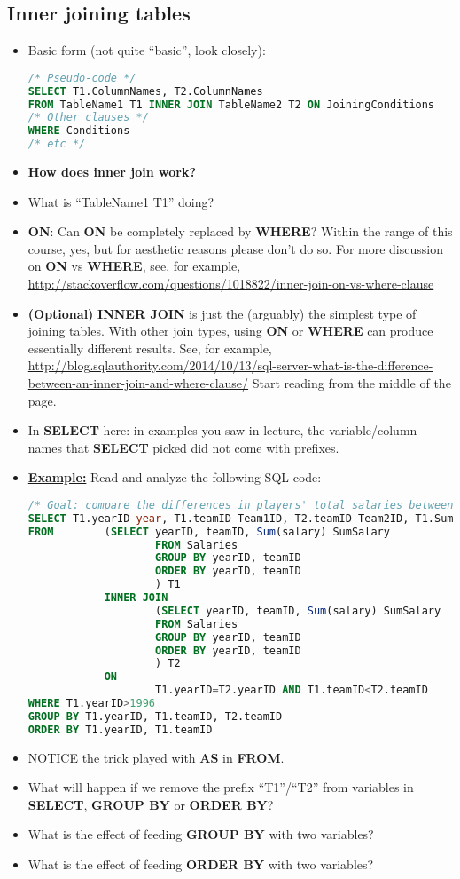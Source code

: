\documentclass[12pt]{article}
\begin{document}
\subsection{Inner joining tables}
\begin{itemize}
	\item Basic form (not quite ``basic'', look closely):
\begin{lstlisting}[style=displaycode, language=SQL]
/* Pseudo-code */
SELECT T1.ColumnNames, T2.ColumnNames
FROM TableName1 T1 INNER JOIN TableName2 T2 ON JoiningConditions
/* Other clauses */
WHERE Conditions
/* etc */
\end{lstlisting}
	\item {\bf How does inner join work?}
	\item What is ``TableName1 T1'' doing?
	\item {\bf ON}: Can {\bf ON} be completely replaced by {\bf WHERE}? Within the range of this course, yes, but for aesthetic reasons please don't do so. For more discussion on {\bf ON} vs {\bf WHERE}, see, for example,\\ \url{http://stackoverflow.com/questions/1018822/inner-join-on-vs-where-clause}
	\item {\bf (Optional)} {\bf INNER JOIN} is just the (arguably) the simplest type of joining tables. With other join types, using {\bf ON} or {\bf WHERE} can produce essentially different results. See, for example,\\
	\url{http://blog.sqlauthority.com/2014/10/13/sql-server-what-is-the-difference-between-an-inner-join-and-where-clause/} Start reading from the middle of the page.
	\item In {\bf SELECT} here: in examples you saw in lecture, the variable/column names that {\bf SELECT} picked did not come with prefixes.
	\item \underline{\bf Example:} Read and analyze the following SQL code:
\begin{lstlisting}[style=displaycode, language=SQL]
/* Goal: compare the differences in players' total salaries between teams for each year since 1996. */
SELECT T1.yearID year, T1.teamID Team1ID, T2.teamID Team2ID, T1.SumSalary-T2.SumSalary SalaryDifference
FROM 		(SELECT yearID, teamID, Sum(salary) SumSalary
					FROM Salaries
					GROUP BY yearID, teamID
					ORDER BY yearID, teamID
					) T1
			INNER JOIN
					(SELECT yearID, teamID, Sum(salary) SumSalary
					FROM Salaries
					GROUP BY yearID, teamID
					ORDER BY yearID, teamID
					) T2
			ON
					T1.yearID=T2.yearID AND T1.teamID<T2.teamID
WHERE T1.yearID>1996
GROUP BY T1.yearID, T1.teamID, T2.teamID
ORDER BY T1.yearID, T1.teamID
\end{lstlisting}
	\item NOTICE the trick played with {\bf AS} in {\bf FROM}.
	\item What will happen if we remove the prefix ``T1''/``T2'' from variables in {\bf SELECT}, {\bf GROUP BY} or {\bf ORDER BY}?
	\item What is the effect of feeding {\bf GROUP BY} with two variables?
	\item What is the effect of feeding {\bf ORDER BY} with two variables?
\end{itemize}
\end{document}
